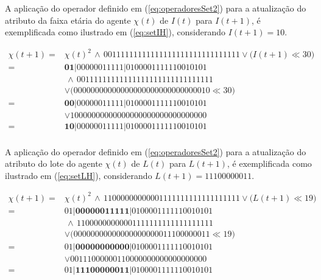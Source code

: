 A aplicação do operador definido em (\ref{eq:operadoresSet2}) para a atualização do atributo da faixa etária do agente $\chi(t)$ de $I(t)$ para $I(t + 1)$, é exemplificada como ilustrado em (\ref{eq:setIH}), considerando $I(t + 1) = 1 0$.

\begin{equation}
 \begin{split}
 \chi(t + 1)   = & \chi(t)^2 \, \wedge \, 00111111111111111111111111111111 \vee \big(I(t + 1) \ll 30\big) \\
	       = & \boldsymbol{0 1} | 0 0 0 0 0 0 1 1 1 1 1 | 0 1 0 0 0 0 1 1 1 1 1 1 0 0 1 0 1 0 1 \\
	         & \, \wedge \, 00111111111111111111111111111111 \\
	         & \vee \big(00000000000000000000000000000010 \ll 30\big) \\
	       = & \boldsymbol{0 0} | 0 0 0 0 0 0 1 1 1 1 1 | 0 1 0 0 0 0 1 1 1 1 1 1 0 0 1 0 1 0 1 \\
	         & \vee 10000000000000000000000000000000 \\
	       = & \boldsymbol{1 0} | 0 0 0 0 0 0 1 1 1 1 1 | 0 1 0 0 0 0 1 1 1 1 1 1 0 0 1 0 1 0 1 \\
 \label{eq:setIH}
 \end{split}
\end{equation}

A aplicação do operador definido em (\ref{eq:operadoresSet2}) para a atualização do atributo do lote do agente $\chi(t)$ de $L(t)$ para $L(t + 1)$, é exemplificada como ilustrado em (\ref{eq:setLH}), considerando $L(t + 1) = 1 1 1 0 0 0 0 0 0 1 1$.

\begin{equation}
 \begin{split}
 \chi(t + 1)   = & \chi(t)^2 \, \wedge \, 11000000000001111111111111111111 \vee \big(L(t + 1) \ll 19\big) \\
	       = & 0 1 | \boldsymbol{0 0 0 0 0 0 1 1 1 1 1} | 0 1 0 0 0 0 1 1 1 1 1 1 0 0 1 0 1 0 1 \\
	         & \, \wedge \, 11000000000001111111111111111111 \\
	         & \vee \big(00000000000000000000011100000011 \ll 19\big) \\
	       = & 0 1 | \boldsymbol{0 0 0 0 0 0 0 0 0 0 0} | 0 1 0 0 0 0 1 1 1 1 1 1 0 0 1 0 1 0 1 \\
	         & \vee 00111000000110000000000000000000 \\
	       = & 0 1 | \boldsymbol{1 1 1 0 0 0 0 0 0 1 1} | 0 1 0 0 0 0 1 1 1 1 1 1 0 0 1 0 1 0 1 \\
 \label{eq:setLH}
 \end{split}
\end{equation}

